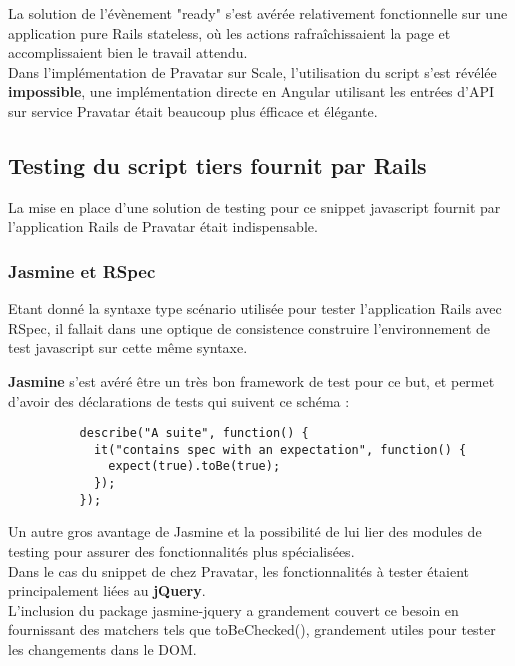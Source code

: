 \documentclass{report}
\begin{document}
          La solution de l'évènement "ready" s'est avérée relativement fonctionnelle sur une application pure Rails stateless, où les actions rafraîchissaient
          la page et accomplissaient bien le travail attendu.\\

          Dans l'implémentation de Pravatar sur Scale, l'utilisation du script s'est révélée \textbf{impossible}, une implémentation directe en Angular utilisant les
          entrées d'API sur service Pravatar était beaucoup plus éfficace et élégante.\\

      \subsection{Testing du script tiers fournit par Rails}
      \label{sub:Testing du script tiers fournit par Rails}

        La mise en place d'une solution de testing pour ce snippet javascript fournit par l'application Rails de Pravatar était indispensable.\\

        \subsubsection{Jasmine et RSpec}
        \label{subs:Jasmine et RSpec}

          Etant donné la syntaxe type scénario utilisée pour tester l'application Rails avec RSpec, il fallait dans une optique de consistence construire l'environnement de test javascript sur cette même syntaxe.

          \textbf{Jasmine} s'est avéré être un très bon framework de test pour ce but, et permet d'avoir des déclarations de tests qui suivent ce schéma :\\

          \begin{lstlisting}
          describe("A suite", function() {
            it("contains spec with an expectation", function() {
              expect(true).toBe(true);
            });
          });
          \end{lstlisting}

          Un autre gros avantage de Jasmine et la possibilité de lui lier des modules de testing pour assurer des fonctionnalités plus spécialisées.\\
          Dans le cas du snippet de chez Pravatar, les fonctionnalités à tester étaient principalement liées au \textbf{jQuery}.\\
          L'inclusion du package jasmine-jquery a grandement couvert ce besoin en fournissant des matchers tels que toBeChecked(), grandement utiles pour tester les changements dans le DOM.\\
\end{document}
